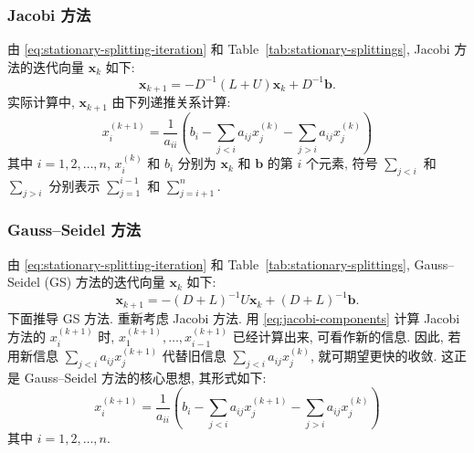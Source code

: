 \subsubsection{{Jacobi 方法}}\label{subsec:jacobi-method}
{由 \eqref{eq:stationary-splitting-iteration} 和 Table~\ref{tab:stationary-splittings}, Jacobi 方法的迭代向量 $\bm x_k$ 如下:}
\[\bm x_{k+1}=-D^{-1}(L+U)\bm x_k+D^{-1}\bm b.\]
{实际计算中, $\bm x_{k+1}$ 由下列递推关系计算:}
\begin{equation}\label{eq:jacobi-components}
x_i^{(k+1)}=\frac1{a_{ii}}\left(b_i-\sum_{j<i}a_{ij}x_j^{(k)}-\sum_{j>i}a_{ij}x_j^{(k)}\right)
\end{equation}
{其中 $i=1,2,\ldots,n$, $x_i^{(k)}$ 和 $b_i$ 分别为 $\bm x_k$ 和 $\bm b$ 的第 $i$ 个元素, 符号 $\sum_{j<i}$ 和 $\sum_{j>i}$ 分别表示 $\sum_{j=1}^{i-1}$ 和 $\sum_{j=i+1}^n$.}
\subsubsection{{Gauss--Seidel 方法}}\label{subsec:gauss-seidel-method}
{由 \eqref{eq:stationary-splitting-iteration} 和 Table~\ref{tab:stationary-splittings}, Gauss--Seidel (GS) 方法的迭代向量 $\bm x_k$ 如下:}
\[\bm x_{k+1}=-(D+L)^{-1}U\bm x_k+(D+L)^{-1}\bm b.\]
{下面推导 GS 方法. 重新考虑 Jacobi 方法. 用 \eqref{eq:jacobi-components} 计算 Jacobi 方法的 $x_i^{(k+1)}$ 时, \linebreak[4]$x_1^{(k+1)},\ldots,x_{i-1}^{(k+1)}$ 已经计算出来, 可看作新的信息. 因此, 若用新信息 $\sum_{j<i}a_{ij}x_j^{(k+1)}$ 代替旧信息 $\sum_{j<i}a_{ij}x_j^{(k)}$, 就可期望更快的收敛. 这正是 Gauss--Seidel 方法的核心思想, 其形式如下:}
\begin{equation}\label{eq:gauss-seidel-components}
x_i^{(k+1)}=\frac1{a_{ii}}\left(b_i-\sum_{j<i}a_{ij}x_j^{(k+1)}-\sum_{j>i}a_{ij}x_j^{(k)}\right)
\end{equation}
{其中 $i=1,2,\ldots,n$.}
